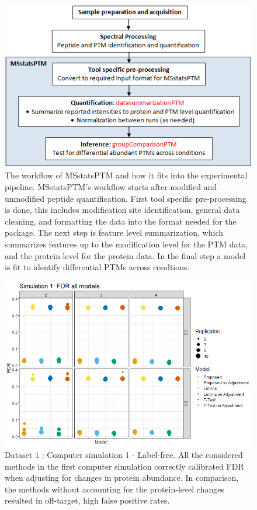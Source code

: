 \documentclass[mcp]{article}
\numberwithin{figure}{section} %
\numberwithin{table}{section}
\begin{document}
\begin{figure}[ht]
\centering
\includegraphics[scale=.8]{images/MSstatsPTM_design.png}
\caption{The workflow of MSstatsPTM and how it fits into the experimental pipeline. MSstatsPTM's workflow starts after modified and unmodified peptide quantification. First tool specific pre-processing is done, this includes modification site identification, general data cleaning, and formatting the data into the format needed for the package. The next step is feature level summarization, which summarizes features up to the modification level for the PTM data, and the protein level for the protein data. In the final step a model is fit to identify differential PTMs across condtions.}
\label{fig:msstatsptm_design}
\end{figure}

\begin{figure}[ht]
\centering
\includegraphics[width=1\textwidth]{images/sim1_FDR_all_models.png}
\caption{Dataset 1 : Computer simulation 1 - Label-free. All the considered methods in the first computer simulation correctly calibrated FDR when adjusting for changes in protein abundance. In comparison, the methods without accounting for the protein-level changes resulted in off-target, high false positive rates.
}\label{fig:fdr_all_models}
\end{figure}
\end{document}
